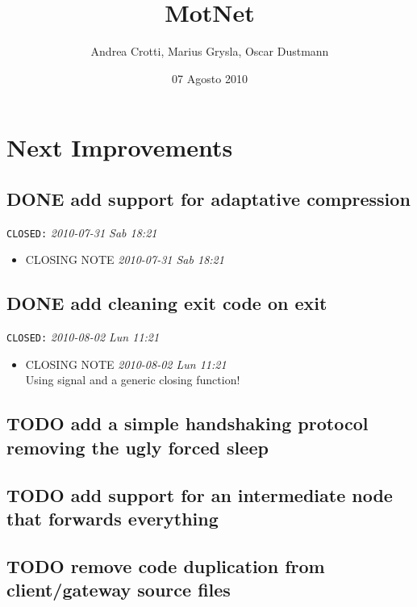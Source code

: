 \documentclass[11pt]{article}
\title{MotNet}
\author{Andrea Crotti, Marius Grysla, Oscar Dustmann}
\date{07 Agosto 2010}
\begin{document}
\maketitle

\setcounter{tocdepth}{3}
\tableofcontents
\vspace*{1cm}

\section{Next Improvements}
\label{sec-1}
\subsection{\textbf{DONE} add support for adaptative compression}
\label{sec-1_1}

   \texttt{CLOSED:} \textit{2010-07-31 Sab 18:21}

\begin{itemize}
\item CLOSING NOTE \textit{2010-07-31 Sab 18:21}
\end{itemize}
\subsection{\textbf{DONE} add cleaning exit code on exit}
\label{sec-1_2}

   \texttt{CLOSED:} \textit{2010-08-02 Lun 11:21}

\begin{itemize}
\item CLOSING NOTE \textit{2010-08-02 Lun 11:21} \\
Using signal and a generic closing function!
\end{itemize}

     
\subsection{\textbf{TODO} add a simple handshaking protocol removing the ugly forced sleep}
\label{sec-1_3}
\subsection{\textbf{TODO} add support for an intermediate node that forwards everything}
\label{sec-1_4}
\subsection{\textbf{TODO} remove code duplication from client/gateway source files}
\label{sec-1_5}
\end{document}
